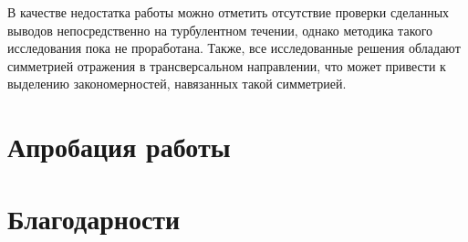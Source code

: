 В качестве недостатка работы можно отметить отсутствие проверки сделанных выводов непосредственно на турбулентном течении, однако методика такого исследования пока не проработана. Также, все исследованные решения обладают симметрией отражения в трансверсальном направлении, что может привести к выделению закономерностей, навязанных такой симметрией. 


\section{Апробация работы}

\section{Благодарности}


